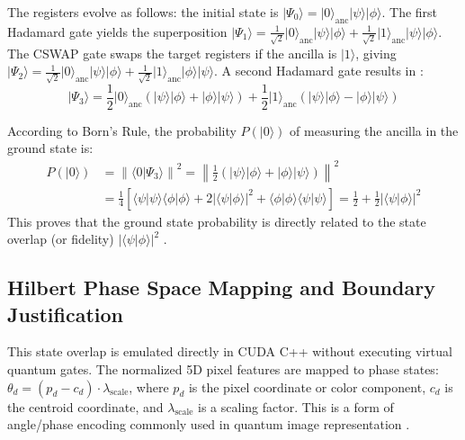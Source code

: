 The registers evolve as follows: the initial state is $\lvert\Psi_0\rangle = \lvert 0 \rangle_{\text{anc}}\lvert\psi\rangle\lvert\phi\rangle$. The first Hadamard gate yields the superposition $\lvert\Psi_1\rangle = \frac{1}{\sqrt{2}}\lvert0\rangle_{\text{anc}}\lvert\psi\rangle\lvert\phi\rangle + \frac{1}{\sqrt{2}}\lvert1\rangle_{\text{anc}}\lvert\psi\rangle\lvert\phi\rangle$. The CSWAP gate swaps the target registers if the ancilla is $\lvert1\rangle$, giving $\lvert\Psi_2\rangle = \frac{1}{\sqrt{2}}\lvert0\rangle_{\text{anc}}\lvert\psi\rangle\lvert\phi\rangle + \frac{1}{\sqrt{2}}\lvert1\rangle_{\text{anc}}\lvert\phi\rangle\lvert\psi\rangle$. A second Hadamard gate results in \cite{buhrman2001quantum}:
\begin{equation}
\label{eq:psi_3}
\lvert\Psi_3\rangle = \frac{1}{2}\lvert0\rangle_{\text{anc}}(\lvert\psi\rangle\lvert\phi\rangle + \lvert\phi\rangle\lvert\psi\rangle) + \frac{1}{2}\lvert1\rangle_{\text{anc}}(\lvert\psi\rangle\lvert\phi\rangle - \lvert\phi\rangle\lvert\psi\rangle)
\end{equation}

According to Born's Rule, the probability $P(\lvert 0 \rangle)$ of measuring the ancilla in the ground state is:
\begin{align}
P(\lvert0\rangle) &= \left\| \langle 0 \rvert \Psi_3 \rangle \right\|^2 = \left\| \frac{1}{2}(\lvert\psi\rangle\lvert\phi\rangle + \lvert\phi\rangle\lvert\psi\rangle) \right\|^2 \\
&= \frac{1}{4} \left[ \langle\psi\vert\psi\rangle\langle\phi\vert\phi\rangle + 2\lvert\langle\psi\vert\phi\rangle\rvert^2 + \langle\phi\vert\phi\rangle\langle\psi\vert\psi\rangle \right] = \frac{1}{2} + \frac{1}{2}\lvert\langle\psi\vert\phi\rangle\rvert^2
\end{align}
This proves that the ground state probability is directly related to the state overlap (or fidelity) $\lvert\langle\psi\vert\phi\rangle\rvert^2$ \cite{buhrman2001quantum}.

\subsection{Hilbert Phase Space Mapping and Boundary Justification}\label{subsect:phasespace}\label{subsect:boundary_justification}
This state overlap is emulated directly in CUDA C++ without executing virtual quantum gates. The normalized 5D pixel features are mapped to phase states: $\theta_d = (p_d - c_d) \cdot \lambda_{\text{scale}}$, where $p_d$ is the pixel coordinate or color component, $c_d$ is the centroid coordinate, and $\lambda_{\text{scale}}$ is a scaling factor. This is a form of angle/phase encoding commonly used in quantum image representation \cite{yang2013novel}.

